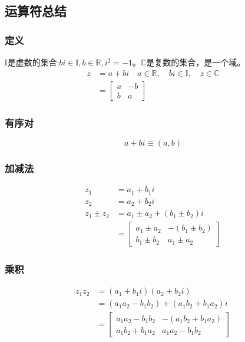 \subsection{运算符总结}
\subsubsection*{定义}
$\mathbb{I}$是虚数的集合:$b i \in \mathbb{I}, b \in \mathbb{R}, i ^{2}=-1$。$\mathbb{C}$是复数的集合，是一个域。
$$
\begin{aligned}
z & =a+b i \quad a \in \mathbb{R}, \quad b i \in \mathbb{I}, \quad z \in \mathbb{C} \\
& =\left[\begin{array}{cc}
a & -b \\
b & a
\end{array}\right]
\end{aligned}
$$

\subsubsection*{有序对}
$$
a+b i \equiv(a, b)
$$

\subsubsection*{加减法}
$$
\begin{aligned}
z_{1} & =a_{1}+b_{1} i \\
z_{2} & =a_{2}+b_{2} i \\
z_{1} \pm z_{2} & =a_{1} \pm a_{2}+\left(b_{1} \pm b_{2}\right) i \\
& =\left[\begin{array}{lc}
a_{1} \pm a_{2} & -\left(b_{1} \pm b_{2}\right) \\
b_{1} \pm b_{2} & a_{1} \pm a_{2}
\end{array}\right]
\end{aligned}
$$

\subsubsection*{乘积}
$$
\begin{aligned}
z_{1} z_{2} & =\left(a_{1}+b_{1} i\right)\left(a_{2}+b_{2} i\right) \\
& =\left(a_{1} a_{2}-b_{1} b_{2}\right)+\left(a_{1} b_{2}+b_{1} a_{2}\right) i \\
& =\left[\begin{array}{cc}
a_{1} a_{2}-b_{1} b_{2} & -\left(a_{1} b_{2}+b_{1} a_{2}\right) \\
a_{1} b_{2}+b_{1} a_{2} & a_{1} a_{2}-b_{1} b_{2}
\end{array}\right]
\end{aligned}
$$

